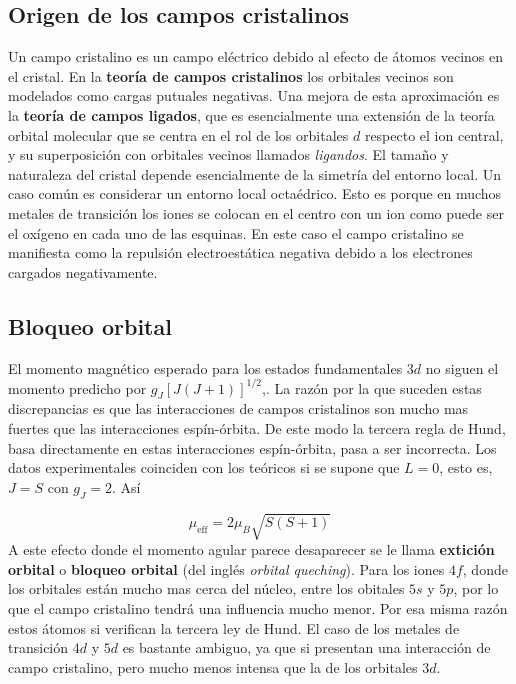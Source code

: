 \documentclass[12pt,a4paper]{book}
\numberwithin{equation}{section}
\numberwithin{figure}{section}
\newcommand{\eff}{\mathrm{eff}}
\begin{document}
\subsection{Origen de los campos cristalinos}

Un campo cristalino es un campo eléctrico debido al efecto de átomos vecinos en el cristal. En la \textbf{teoría de campos cristalinos} los orbitales vecinos son modelados como cargas putuales negativas. Una mejora de esta aproximación es la \textbf{teoría de campos ligados}, que es esencialmente una extensión de la teoría orbital molecular que se centra en el rol de los orbitales $d$ respecto el ion central, y su superposición con orbitales vecinos llamados \textit{ligandos}. El tamaño y naturaleza del cristal depende esencialmente de la simetría del entorno local. Un caso común es considerar un entorno local octaédrico. Esto es porque en muchos metales de transición los iones se colocan en el centro con un ion como puede ser el oxígeno en cada uno de las esquinas. En este caso el campo cristalino se manifiesta como la repulsión electroestática negativa debido a los electrones cargados negativamente. \\

\subsection{Bloqueo orbital}

El momento magnético esperado para los estados fundamentales $3d$ no siguen el momento predicho por $g_J[J(J+1)]^{1/2}$,. La razón por la que suceden estas discrepancias es que las interacciones de campos  cristalinos son mucho mas fuertes que las interacciones espín-órbita. De este modo la tercera regla de Hund, basa directamente en estas interacciones espín-órbita, pasa a ser incorrecta. Los datos experimentales coinciden con los teóricos si se supone que $L=0$, esto es, $J=S$ con $g_J = 2$. Así

\begin{equation}
    \mu_{\eff} = 2 \mu_B \sqrt{S(S+1)}
\end{equation}
A este efecto donde el momento agular parece desaparecer se le llama \textbf{extición orbital} o \textbf{bloqueo orbital} (del inglés \textit{orbital queching}). Para los iones $4f$, donde los orbitales están mucho mas cerca del núcleo, entre los obitales $5s$ y $5p$, por lo que el campo cristalino tendrá una influencia mucho menor. Por esa misma razón estos átomos si verifican la tercera ley de Hund. El caso de los metales de transición $4d$ y $5d$ es bastante ambiguo, ya que si presentan una interacción de campo cristalino, pero mucho menos intensa que la de los orbitales $3d$. \\
\end{document}
